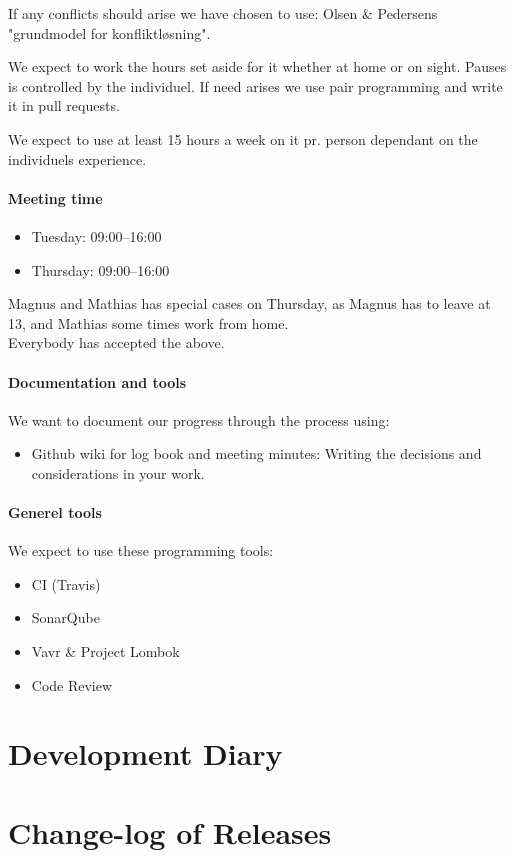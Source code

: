 \documentclass[11pt]{article}
\begin{document}
If any conflicts should arise we have chosen to use:
Olsen & Pedersens "grundmodel for konfliktløsning".

We expect to work the hours set aside for it whether at home or on sight. Pauses is controlled by the individuel. If need arises we use pair programming and write it in pull requests.

We expect to use at least 15 hours a week on it pr. person dependant on the individuels experience.

\paragraph{Meeting time}

\begin{itemize}
    \item Tuesday: 09:00--16:00
    \item Thursday: 09:00--16:00
\end{itemize}
Magnus and Mathias has special cases on Thursday, as Magnus has to leave at 13, and Mathias some times work from home. \\
Everybody has accepted the above.

\paragraph{Documentation and tools}
We want to document our progress through the process using:
\begin{itemize}
    \item Github wiki for log book and meeting minutes: Writing the decisions and considerations in your work.
\end{itemize}

\paragraph{Generel tools}
We expect to use these programming tools:
\begin{itemize}
    \item CI (Travis)
    \item SonarQube
    \item Vavr & Project Lombok
    \item Code Review
\end{itemize}

\section{Development Diary}

\section{Change-log of Releases}
\end{document}
